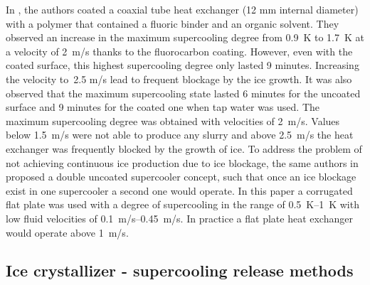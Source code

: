 In \cite{wang_experimental_2012}, the authors coated  a coaxial tube heat exchanger (12 mm internal diameter) with a polymer that contained a fluoric binder and an organic solvent. They observed an increase in the maximum supercooling degree from 0.9~K to 1.7~K at a velocity of 2~m/s thanks to the fluorocarbon coating. However, even with the coated surface, this highest supercooling degree only lasted 9 minutes. Increasing the velocity to~2.5 m/s lead to frequent blockage by the ice growth.
It was also observed that the maximum supercooling state lasted 6 minutes for the uncoated surface and 9 minutes for the coated one when tap water was used.
The maximum supercooling degree was obtained with velocities of 2~m/s. Values below 1.5~m/s were not able to produce any slurry and above 2.5~m/s the heat exchanger was frequently blocked by the growth of ice.
To address the problem of not achieving continuous ice production  due to ice blockage, the same authors in \cite{wang_investigation_2016} proposed a double uncoated supercooler concept, such that once an ice blockage exist in one supercooler a second one would operate. In this paper a corrugated flat plate was used with a degree of supercooling in the range of \SIrange{0.5}{1}{K} with low fluid velocities of \SIrange{0.1}{0.45}{m/s}. In practice a flat plate heat exchanger would operate above 1~m/s. 





\subsection{Ice crystallizer - supercooling release methods}
\label{section_lit_review_ice_crystalizer}


